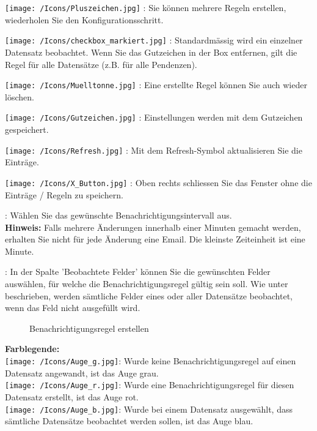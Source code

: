 \begin{compactitem}
	\item \texttt{[image: /Icons/Pluszeichen.jpg]} : Sie können mehrere Regeln erstellen, wiederholen Sie den Konfigurationsschritt.
	\item \texttt{[image: /Icons/checkbox\_markiert.jpg]} : Standardmässig wird ein einzelner Datensatz beobachtet. Wenn Sie das Gutzeichen in der Box entfernen, gilt die Regel für alle Datensätze (z.B. für alle Pendenzen).
	\item \texttt{[image: /Icons/Muelltonne.jpg]} : Eine erstellte Regel können Sie auch wieder löschen.
	\item \texttt{[image: /Icons/Gutzeichen.jpg]} : Einstellungen werden mit dem Gutzeichen gespeichert.
	\item \texttt{[image: /Icons/Refresh.jpg]} : Mit dem Refresh-Symbol aktualisieren Sie die Einträge.
	\item \texttt{[image: /Icons/X\_Button.jpg]} : Oben rechts schliessen Sie das Fenster ohne die Einträge / Regeln zu speichern.
	\item {}: Wählen Sie das gewünschte Benachrichtigungsintervall aus.\\
	\textbf{Hinweis:} Falls mehrere Änderungen innerhalb einer Minuten gemacht werden, erhalten Sie nicht für jede Änderung eine Email. Die kleinste Zeiteinheit ist eine Minute.
	\item {}: In der Spalte 'Beobachtete Felder' können Sie die gewünschten Felder auswählen, für welche die Benachrichtigungsregel gültig sein soll. Wie unter  beschrieben, werden sämtliche Felder eines oder aller Datensätze beobachtet, wenn das Feld nicht ausgefüllt wird.
\end{compactitem}

\begin{figure}[H]
\caption{Benachrichtigungsregel erstellen}
\end{figure}

\textbf{Farblegende:}\\
\texttt{[image: /Icons/Auge\_g.jpg]}: Wurde keine Benachrichtigungsregel auf einen Datensatz angewandt, ist das Auge grau.\\
\texttt{[image: /Icons/Auge\_r.jpg]}: Wurde eine Benachrichtigungsregel für diesen Datensatz erstellt, ist das Auge rot.\\
\texttt{[image: /Icons/Auge\_b.jpg]}: Wurde bei einem Datensatz ausgewählt, dass sämtliche Datensätze beobachtet werden sollen, ist das Auge blau.\\

